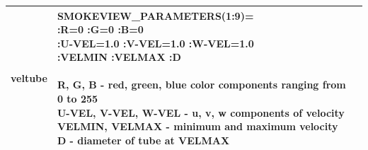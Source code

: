 \begin{longtable}[ht]{|l|l|c|}
{\ct veltube} &
\parbox[c]{\boxwidth}{
{\ct SMOKEVIEW\_PARAMETERS(1:9)=}\\
:R=0 :G=0 :B=0 \\
:U-VEL=1.0 :V-VEL=1.0 :W-VEL=1.0  \\
:VELMIN :VELMAX :D \\  \\
R, G, B - red, green, blue color components ranging from 0 to 255\\
U-VEL, V-VEL, W-VEL - u, v, w components of velocity\\
VELMIN, VELMAX - minimum and maximum velocity\\
D - diameter of tube at VELMAX
} &
 \\ \hline
\end{longtable}
